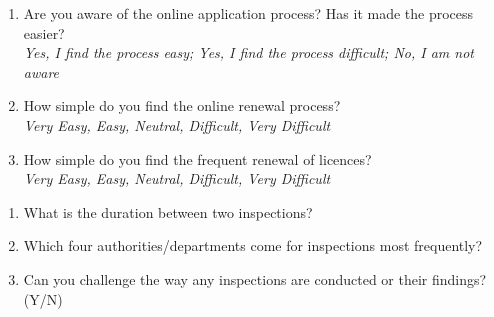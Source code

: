 \documentclass[a4paper, 12pt]{article}
\begin{document}
		\begin {enumerate}[nosep]
		\item Are you aware of the online application process? Has it made the process easier?\\
		\textit{Yes, I find the process easy; Yes, I find the process difficult; No, I am not aware}
		\item How simple do you find the online renewal process?\\
		\textit{Very Easy, Easy, Neutral, Difficult, Very Difficult}
		\item How simple do you find the frequent renewal of licences?\\
		\textit{Very Easy, Easy, Neutral, Difficult, Very Difficult}
		\end {enumerate}

		\begin {enumerate} [nosep]
		\item What is the duration between two inspections?
		\item Which four authorities/departments come for inspections most frequently?
		\item Can you challenge the way any inspections are conducted or their findings? (Y/N)
		\end {enumerate} 
\end{document}
